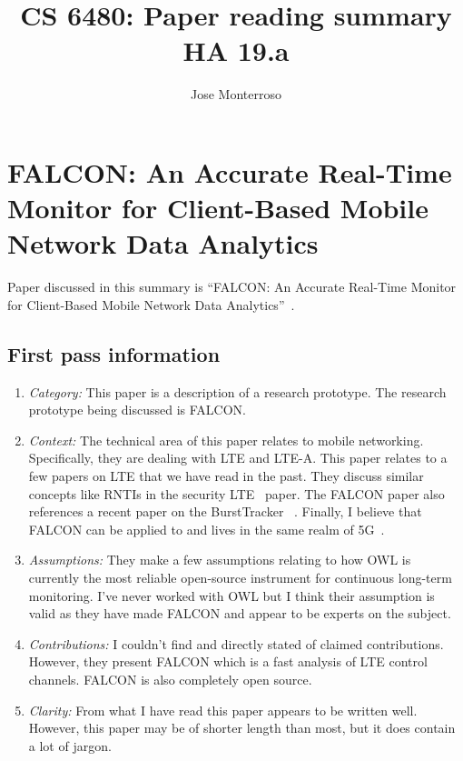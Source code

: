 \documentclass[letterpaper,twocolumn,10pt]{article}
\title{CS 6480: Paper reading summary\\
HA 19.a\\}
\author{Jose Monterroso}
\affil{School of Computing, University of Utah}
\begin{document}
\maketitle
\section{FALCON: An Accurate Real-Time Monitor for Client-Based Mobile Network Data Analytics}

Paper discussed in this summary is ``FALCON: An Accurate Real-Time Monitor for Client-Based Mobile Network Data Analytics''~\cite{falcon}.

\subsection{First pass information}
\label{sec:first}
\begin{enumerate}

\item {\it Category:}
This paper is a description of a research prototype. The research prototype being discussed is FALCON. 

\item {\it Context:} 
The technical area of this paper relates to mobile networking. Specifically, they are dealing with LTE and LTE-A.
This paper relates to a few papers on LTE that we have read in the past. They discuss similar concepts like RNTIs
in the security LTE~\cite{breakinglte} paper. The FALCON paper also references a recent paper on the BurstTracker
~\cite{detectinglte}. Finally, I believe that FALCON can be applied to and lives in the same realm of 5G~\cite{5gwhite}.

\item {\it Assumptions:}  
They make a few assumptions relating to how OWL is currently the most reliable open-source instrument for
continuous long-term monitoring. I've never worked with OWL but I think their assumption is valid as they 
have made FALCON and appear to be experts on the subject. 

\item {\it Contributions:}
I couldn't find and directly stated of claimed contributions. However, they present FALCON which is 
a fast analysis of LTE control channels. FALCON is also completely open source. 

\item {\it Clarity:} 
From what I have read this paper appears to be written well. However, this paper may be of shorter
length than most, but it does contain a lot of jargon.

\end{enumerate}
\end{document}
